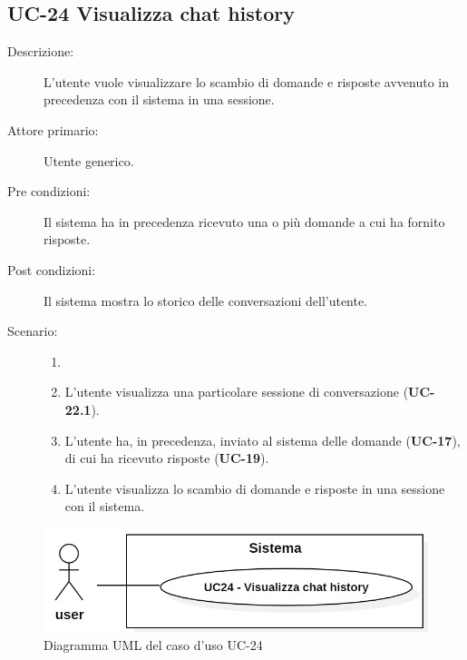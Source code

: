 \subsection{UC-24 Visualizza chat history}
\begin{description}
    \item[Descrizione:] L'utente vuole visualizzare lo scambio di domande e risposte avvenuto in precedenza con il sistema in una sessione.
    \item[Attore primario:] Utente generico.
    \item[Pre condizioni:] Il sistema ha in precedenza ricevuto una o più domande a cui ha fornito risposte.
    \item[Post condizioni:] Il sistema mostra lo storico delle conversazioni dell'utente.
    \item[Scenario:]
    \begin{enumerate}
        \item[]
        \item L'utente visualizza una particolare sessione di conversazione (\textbf{UC-22.1}).
        \item L'utente ha, in precedenza, inviato al sistema delle domande (\textbf{UC-17}), di cui ha ricevuto risposte (\textbf{UC-19}).
        \item L'utente visualizza lo scambio di domande e risposte in una sessione con il sistema.
    \end{enumerate}
    
\end{description} 

\begin{figure}[H]
    \centering
    \includegraphics[width=0.9\linewidth]{UC24.PNG}
    \caption{Diagramma UML del caso d'uso UC-24}
    \label{fig:UC28-29}
\end{figure}

